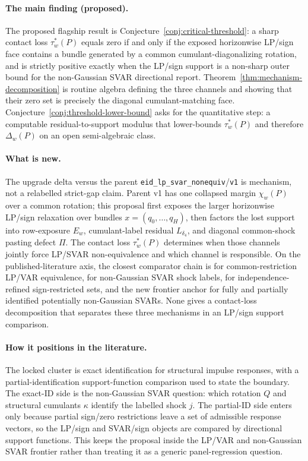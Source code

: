 \documentclass[11pt]{article}
\theoremstyle{definition}
\theoremstyle{plain}
\theoremstyle{remark}
\begin{document}
\paragraph{The main finding (proposed).}
The proposed flagship result is Conjecture~\ref{conj:critical-threshold}: a sharp contact loss \(\tau_w^*(P)\) equals zero if and only if the exposed horizonwise LP/sign face contains a bundle generated by a common cumulant-diagonalizing rotation, and is strictly positive exactly when the LP/sign support is a non-sharp outer bound for the non-Gaussian SVAR directional report.  Theorem~\ref{thm:mechanism-decomposition} is routine algebra defining the three channels and showing that their zero set is precisely the diagonal cumulant-matching face.  Conjecture~\ref{conj:threshold-lower-bound} asks for the quantitative step: a computable residual-to-support modulus that lower-bounds \(\tau_w^*(P)\) and therefore \(\Delta_w(P)\) on an open semi-algebraic class.

\paragraph{What is new.}
The upgrade delta versus the parent \texttt{eid\_lp\_svar\_nonequiv}/\texttt{v1} is mechanism, not a relabelled strict-gap claim.  Parent v1 has one collapsed margin \(\chi_w(P)\) over a common rotation; this proposal first exposes the larger horizonwise LP/sign relaxation over bundles \(x=(q_0,\ldots,q_H)\), then factors the lost support into row-exposure \(E_w\), cumulant-label residual \(L_{\delta_4}\), and diagonal common-shock pasting defect \(\Pi\).  The contact loss \(\tau_w^*(P)\) determines when those channels jointly force LP/SVAR non-equivalence and which channel is responsible.  On the published-literature axis, the closest comparator chain is \citet[pp.~955--980 and the abstract's common-estimand claim]{PlagborgMollerWolf2021} for common-restriction LP/VAR equivalence, \citet[pp.~288--304]{LanneMeitzSaikkonen2017} for non-Gaussian SVAR shock labels, \citet[pp.~1827--1847]{DrautzburgWright2023} for independence-refined sign-restricted sets, and the new frontier anchor \citet[abstract and pp.~1--3]{AnttonenLanneLuoto2024} for fully and partially identified potentially non-Gaussian SVARs.  None gives a contact-loss decomposition that separates these three mechanisms in an LP/sign support comparison.

\paragraph{How it positions in the literature.}
The locked cluster is exact identification for structural impulse responses, with a partial-identification support-function comparison used to state the boundary.  The exact-ID side is the non-Gaussian SVAR question: which rotation \(Q\) and structural cumulants \(\kappa\) identify the labelled shock \(j\).  The partial-ID side enters only because partial sign/zero restrictions leave a set of admissible response vectors, so the LP/sign and SVAR/sign objects are compared by directional support functions.  This keeps the proposal inside the LP/VAR and non-Gaussian SVAR frontier rather than treating it as a generic panel-regression question.
\end{document}
